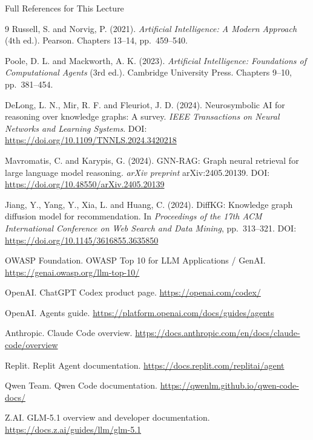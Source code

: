\documentclass[aspectratio=169]{beamer}
\newcommand{\defaultdeckrefs}{AIMA4e Ch.10 pp.314--343; Poole3e Ch.16--17 pp.701--766; platform docs listed at end}
\newcommand{\currentsliderefs}{\defaultdeckrefs}
\newcommand{\setslideref}[1]{\gdef\currentsliderefs{#1}}
\begin{document}
\setslideref{Paper and platform details are listed on this slide}
\begin{frame}[allowframebreaks]{Full References for This Lecture}
\footnotesize
\begin{thebibliography}{9}
Russell, S. and Norvig, P. (2021).
\newblock \textit{Artificial Intelligence: A Modern Approach} (4th ed.).
\newblock Pearson. Chapters 13--14, pp.~459--540.

Poole, D. L. and Mackworth, A. K. (2023).
\newblock \textit{Artificial Intelligence: Foundations of Computational Agents} (3rd ed.).
\newblock Cambridge University Press. Chapters 9--10, pp.~381--454.

DeLong, L. N., Mir, R. F. and Fleuriot, J. D. (2024).
\newblock Neurosymbolic AI for reasoning over knowledge graphs: A survey.
\newblock \textit{IEEE Transactions on Neural Networks and Learning Systems}.
\newblock DOI: \url{https://doi.org/10.1109/TNNLS.2024.3420218}

Mavromatis, C. and Karypis, G. (2024).
\newblock GNN-RAG: Graph neural retrieval for large language model reasoning.
\newblock \textit{arXiv preprint} arXiv:2405.20139.
\newblock DOI: \url{https://doi.org/10.48550/arXiv.2405.20139}

Jiang, Y., Yang, Y., Xia, L. and Huang, C. (2024).
\newblock DiffKG: Knowledge graph diffusion model for recommendation.
\newblock In \textit{Proceedings of the 17th ACM International Conference on Web Search and Data Mining}, pp.~313--321.
\newblock DOI: \url{https://doi.org/10.1145/3616855.3635850}

OWASP Foundation.
\newblock OWASP Top 10 for LLM Applications / GenAI.
\newblock \url{https://genai.owasp.org/llm-top-10/}

OpenAI.
\newblock ChatGPT Codex product page.
\newblock \url{https://openai.com/codex/}

OpenAI.
\newblock Agents guide.
\newblock \url{https://platform.openai.com/docs/guides/agents}

Anthropic.
\newblock Claude Code overview.
\newblock \url{https://docs.anthropic.com/en/docs/claude-code/overview}

Replit.
\newblock Replit Agent documentation.
\newblock \url{https://docs.replit.com/replitai/agent}

Qwen Team.
\newblock Qwen Code documentation.
\newblock \url{https://qwenlm.github.io/qwen-code-docs/}

Z.AI.
\newblock GLM-5.1 overview and developer documentation.
\newblock \url{https://docs.z.ai/guides/llm/glm-5.1}
\end{thebibliography}
\end{frame}
\end{document}
